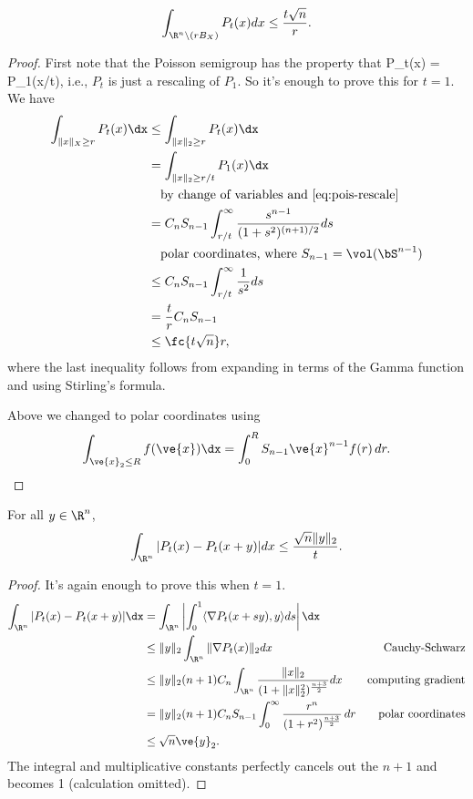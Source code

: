 \begin{pr}[Fact 1]
\[
\int_{\R^n \setminus (rB_X)} P_t(x)dx \leq \frac{t\sqrt{n}}{r}.
\]
\end{pr}
\begin{proof}
First note that the Poisson semigroup has the property that 
P_t(x) = P_1(x/t),
\eeq 
i.e., $P_t$ is just a rescaling of $P_1$. So it's enough to prove this for $t = 1$. We have
\begin{align*}
\int_{\|x\|_X \geq r} P_t(x)\dx 
&\leq \int_{\|x\|_2 \geq r} P_t(x) \dx\\
&= \int_{\|x\|_2 \geq r/t} P_1(x)\dx\\
&\quad \text{by change of variables and~\eqref{eq:pois-rescale}}\\
&= C_n S_{n - 1} \int_{r/t}^{\infty} \frac{s^{n - 1}}{(1 + s^2)^{(n + 1)/2}} ds \\
&\quad \text{polar coordinates, where }S_{n-1}=\vol(\bS^{n-1})\\
&\leq C_nS_{n - 1} \int_{r/t}^{\infty} \frac{1}{s^2} ds\\
& = \frac{t}{r}C_nS_{n - 1}\\
&\le \fc{t\sqrt n}r,
\end{align*}
where the last inequality follows from expanding in terms of the Gamma function and using Stirling's formula. 

Above we changed to polar coordinates using
\[
\int_{\ve{x}_2\le R} f(\ve{x})\dx=\int_0^R S_{n-1}\ve{x}^{n-1} f(r)\,dr.
\]
\end{proof}
\begin{pr}[Fact 2]\label{pr:pois2}
For all $y \in \R^n$, 
$$\int_{\R^n} |P_t(x) - P_t(x + y)| dx \le \frac{\sqrt{n}\|y\|_2}{t}.$$
\end{pr}
\begin{proof}
It's again enough to prove this when $t = 1$. 
\begin{align*}
\int_{\R^n} |P_t(x) - P_t(x + y)| \dx 
&= \int_{\R^n} \left| \int_{0}^1 \langle \nabla P_t(x + sy), y \rangle ds\right| \dx 
\\
&\leq \|y\|_2 \int_{\R^n} \|\nabla P_t(x)\|_2 dx&\text{Cauchy-Schwarz}\\
	&\le 
	\|y\|_2(n + 1)C_n\int_{\R^n} \frac{\|x\|_2}{(1 + \|x\|_2^2)^{\frac{n + 3}{2}}} dx&\text{computing gradient}\\
	&= \|y\|_2 (n + 1)C_n S_{n - 1} \int_{0}^{\infty} \frac{r^n}{(1 + r^2)^{\frac{n + 3}{2}}} \,dr  &\text{polar coordinates}\\
	&\le \sqrt{n}\ve{y}_2.
\end{align*}
The integral and multiplicative constants perfectly cancels out the $n + 1$ and becomes 1 (calculation omitted).
\end{proof}
